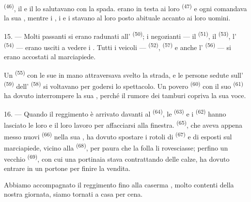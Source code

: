  \textsuperscript{(46)}, il 
e il  lo salutavano con la spada.  erano
in testa ai loro  \textsuperscript{(47)} e ogni 
comandava la sua , mentre i , i
 e i  stavano al loro posto abituale
accanto ai loro uomini.

15. --- Molti passanti si erano radunati all'
\textsuperscript{(50)}; i negozianti --- il 
\textsuperscript{(51)}, il  \textsuperscript{(53)}, l'
\textsuperscript{(54)} --- erano usciti a vedere i . Tutti i veicoli ---
 \textsuperscript{(52)}, 
\textsuperscript{(57)} e anche l' \textsuperscript{(56)} --- si
erano accostati al marciapiede.

\VUsaut{3.0mm}

Un  \textsuperscript{(55)} con le sue
 in mano attraversava svelto la strada, e le persone sedute
sull' \textsuperscript{(59)} dell'
\textsuperscript{(58)} si voltavano per godersi lo spettacolo. Un povero
 \textsuperscript{(60)} con il suo 
\textsuperscript{(61)} ha dovuto interrompere la sua , perché il rumore
dei tamburi copriva la sua voce.

16. --- Quando il reggimento è arrivato davanti al 
\textsuperscript{(64)}, le  \textsuperscript{(63)} e i 
\textsuperscript{(62)} hanno lasciato le loro  e il loro
lavoro per affacciarsi alla finestra.  \textsuperscript{(65)},
che aveva appena messo  nuovi \textsuperscript{(66)} nella sua
, ha dovuto spostare i rotoli di 
\textsuperscript{(67)} e di  esposti sul marciapiede, vicino alla
 \textsuperscript{(68)}, per paura che la folla li rovesciasse;
perfino un vecchio  \textsuperscript{(69)}, con cui una
portinaia stava contrattando delle calze, ha dovuto entrare in un portone per finire la
vendita.

Abbiamo accompagnato il reggimento fino alla caserma , molto contenti della
nostra giornata, siamo tornati a casa per cena.

